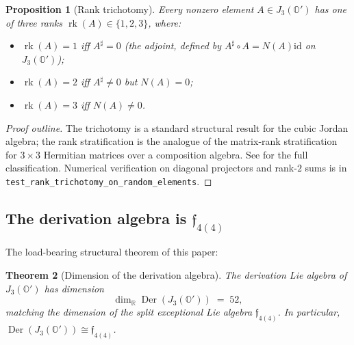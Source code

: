\documentclass[11pt,a4paper]{article}
\theoremstyle{plain}
\newtheorem{theorem}{Theorem}[section]
\newtheorem{proposition}[theorem]{Proposition}
\theoremstyle{definition}
\theoremstyle{remark}
\numberwithin{equation}{section}
\providecommand{\R}{\mathbb{R}}
\providecommand{\Os}{\mathbb{O}'}
\providecommand{\fk}[1]{\mathfrak{#1}}
\DeclareMathOperator{\Der}{Der}
\DeclareMathOperator{\rk}{rk}
\providecommand{\id}{\mathrm{id}}
\begin{document}
\begin{proposition}[Rank trichotomy]
\label{prop:rank-trichotomy}
Every nonzero element $A \in J_3(\Os)$ has one of three
\emph{ranks} $\rk(A) \in \{1, 2, 3\}$, where:
\begin{itemize}
  \item $\rk(A) = 1$ iff $A^{\sharp} = 0$ (the adjoint, defined by
    $A^\sharp \circ A = N(A) \id$ on $J_3(\Os)$);
  \item $\rk(A) = 2$ iff $A^\sharp \ne 0$ but $N(A) = 0$;
  \item $\rk(A) = 3$ iff $N(A) \ne 0$.
\end{itemize}
\end{proposition}

\begin{proof}[Proof outline]
The trichotomy is a standard structural result for the cubic
Jordan algebra; the rank stratification is the analogue of the
matrix-rank stratification for $3 \times 3$ Hermitian matrices
over a composition algebra.  See
\cite{jacobson1968,mccrimmon2004} for the full classification.
Numerical verification on diagonal projectors and rank-$2$ sums
is in \texttt{test\_rank\_trichotomy\_on\_random\_elements}.
\end{proof}

\subsection{The derivation algebra is \texorpdfstring{$\fk{f}_{4(4)}$}{f4(4)}}

The load-bearing structural theorem of this paper:

\begin{theorem}[Dimension of the derivation algebra]
\label{thm:dim-derivation}
The derivation Lie algebra of $J_3(\Os)$ has dimension
\begin{equation}
  \dim_\R \Der(J_3(\Os)) \;=\; 52,
  \label{eq:dim-der}
\end{equation}
matching the dimension of the split exceptional Lie algebra
$\fk{f}_{4(4)}$.  In particular, $\Der(J_3(\Os)) \cong
\fk{f}_{4(4)}$.
\end{theorem}
\end{document}
